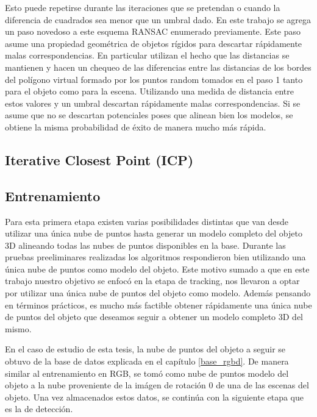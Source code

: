 Esto puede repetirse durante las iteraciones que se pretendan o cuando la diferencia de cuadrados sea menor que un umbral dado. En este trabajo se agrega un paso novedoso a este esquema RANSAC enumerado previamente. Este paso asume una propiedad geométrica de objetos rígidos para descartar rápidamente malas correspondencias. En particular utilizan el hecho que las distancias se mantienen y hacen un chequeo de las diferencias entre las distancias de los bordes del polígono virtual formado por los puntos random tomados en el paso 1 tanto para el objeto como para la escena. Utilizando una medida de distancia entre estos valores y un umbral descartan rápidamente malas correspondencias. Si se asume que no se descartan potenciales poses que alinean bien los modelos, se obtiene la misma probabilidad de éxito de manera mucho más rápida.


\subsection{Iterative Closest Point (ICP)}\label{ICP}


\subsection{Entrenamiento}
Para esta primera etapa existen varias posibilidades distintas que van desde utilizar una única nube de puntos hasta generar un modelo completo del objeto 3D alineando todas las nubes de puntos disponibles en la base. Durante las pruebas preeliminares realizadas los algoritmos respondieron bien utilizando una única nube de puntos como modelo del objeto. Este motivo sumado a que en este trabajo nuestro objetivo se enfocó en la etapa de tracking, nos llevaron a optar por utilizar una única nube de puntos del objeto como modelo. Además pensando en términos prácticos, es mucho más factible obtener rápidamente una única nube de puntos del objeto que deseamos seguir a obtener un modelo completo 3D del mismo.

En el caso de estudio de esta tesis, la nube de puntos del objeto a seguir se obtuvo de la base de datos explicada en el capítulo \ref{base_rgbd}. De manera similar al entrenamiento en RGB, se tomó como nube de puntos modelo del objeto a la nube proveniente de la imágen de rotación 0 de una de las escenas del objeto. Una vez almacenados estos datos, se continúa con la siguiente etapa que es la de detección.


